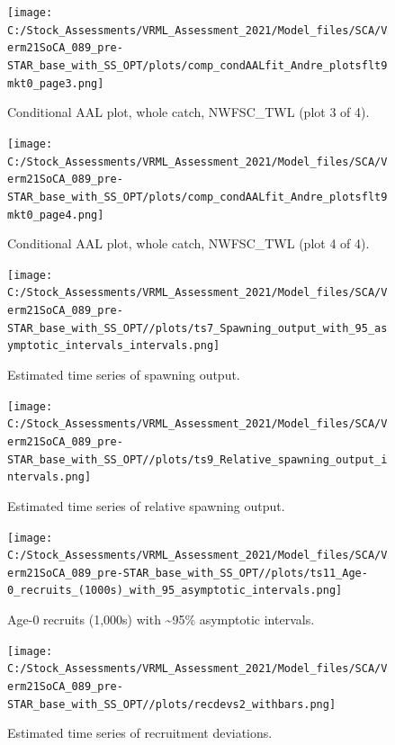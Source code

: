 \documentclass[
  english,
  a4paper,
]{article}
\begin{document}
\begin{figure}
\centering
\texttt{[image: C:/Stock\_Assessments/VRML\_Assessment\_2021/Model\_files/SCA/Verm21SoCA\_089\_pre-STAR\_base\_with\_SS\_OPT/plots/comp\_condAALfit\_Andre\_plotsflt9mkt0\_page3.png]}
\caption{Conditional AAL plot, whole catch, NWFSC\_TWL (plot 3 of 4).\label{fig:comp_condAALfit_Andre_plotsflt9mkt0_page3}}
\end{figure}

\begin{figure}
\centering
\texttt{[image: C:/Stock\_Assessments/VRML\_Assessment\_2021/Model\_files/SCA/Verm21SoCA\_089\_pre-STAR\_base\_with\_SS\_OPT/plots/comp\_condAALfit\_Andre\_plotsflt9mkt0\_page4.png]}
\caption{Conditional AAL plot, whole catch, NWFSC\_TWL (plot 4 of 4).\label{fig:comp_condAALfit_Andre_plotsflt9mkt0_page4}}
\end{figure}

\FloatBarrier

\begin{figure}
\centering
\texttt{[image: C:/Stock\_Assessments/VRML\_Assessment\_2021/Model\_files/SCA/Verm21SoCA\_089\_pre-STAR\_base\_with\_SS\_OPT//plots/ts7\_Spawning\_output\_with\_95\_asymptotic\_intervals\_intervals.png]}
\caption{Estimated time series of spawning output.\label{fig:ssb}}
\end{figure}

\begin{figure}
\centering
\texttt{[image: C:/Stock\_Assessments/VRML\_Assessment\_2021/Model\_files/SCA/Verm21SoCA\_089\_pre-STAR\_base\_with\_SS\_OPT//plots/ts9\_Relative\_spawning\_output\_intervals.png]}
\caption{Estimated time series of relative spawning output.\label{fig:depl}}
\end{figure}

\FloatBarrier

\begin{figure}
\centering
\texttt{[image: C:/Stock\_Assessments/VRML\_Assessment\_2021/Model\_files/SCA/Verm21SoCA\_089\_pre-STAR\_base\_with\_SS\_OPT//plots/ts11\_Age-0\_recruits\_(1000s)\_with\_95\_asymptotic\_intervals.png]}
\caption{Age-0 recruits (1,000s) with \textasciitilde95\% asymptotic intervals.\label{fig:recruits}}
\end{figure}

\begin{figure}
\centering
\texttt{[image: C:/Stock\_Assessments/VRML\_Assessment\_2021/Model\_files/SCA/Verm21SoCA\_089\_pre-STAR\_base\_with\_SS\_OPT//plots/recdevs2\_withbars.png]}
\caption{Estimated time series of recruitment deviations.\label{fig:recdevs}}
\end{figure}
\end{document}
